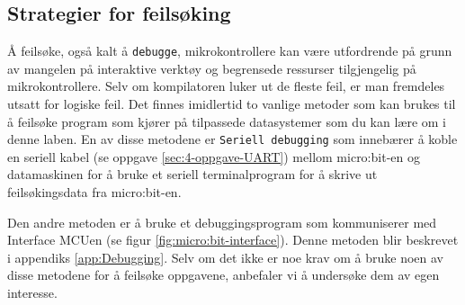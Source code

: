 \begin{alphasection}
\subsection{Strategier for feilsøking}
Å feilsøke, også kalt å \verb|debugge|, mikrokontrollere kan være utfordrende på grunn av mangelen på interaktive verktøy og begrensede ressurser tilgjengelig på mikrokontrollere. Selv om kompilatoren luker ut de fleste feil, er man fremdeles utsatt for logiske feil. Det finnes imidlertid to vanlige metoder som kan brukes til å feilsøke program som kjører på tilpassede datasystemer som du kan lære om i denne laben. En av disse metodene er \verb|Seriell debugging| som innebærer å koble en seriell kabel (se oppgave \ref{sec:4-oppgave-UART}) mellom micro:bit-en og datamaskinen for å bruke et seriell terminalprogram for å skrive ut feilsøkingsdata fra micro:bit-en. 

Den andre metoden er å bruke et debuggingsprogram som kommuniserer med Interface MCUen (se figur \ref{fig:micro:bit-interface}). Denne metoden blir beskrevet i appendiks \ref{app:Debugging}. Selv om det ikke er noe krav om å bruke noen av disse metodene for å feilsøke oppgavene, anbefaler vi å undersøke dem av egen interesse.


\end{alphasection}



\setcounter{section}{0}
